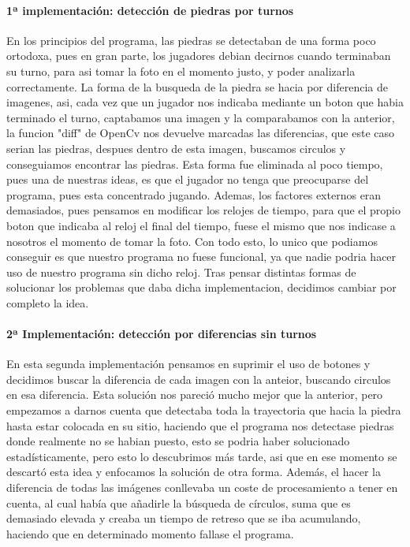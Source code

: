 \documentclass[12pt,a4paper]{report}
\begin{document}
\paragraph{1ª implementación: detección de piedras por turnos}
En los principios del programa, las piedras se detectaban de una forma poco
ortodoxa, pues en gran parte, los jugadores debian decirnos cuando terminaban su
turno, para asi tomar la foto en el momento justo, y poder analizarla
correctamente.  La forma de la busqueda de la piedra se hacia por diferencia de
imagenes, asi, cada vez que un jugador nos indicaba mediante un boton que habia
terminado el turno, captabamos una imagen y la comparabamos con la anterior, la
funcion "diff" de OpenCv nos devuelve marcadas las diferencias, que este caso
serian las piedras, despues dentro de esta imagen, buscamos circulos y
conseguiamos encontrar las piedras.  Esta forma fue eliminada al poco tiempo,
pues una de nuestras ideas, es que el jugador no tenga que preocuparse del
programa, pues esta concentrado jugando. Ademas, los factores externos eran
demasiados, pues pensamos en modificar los relojes de tiempo, para que el propio
boton que indicaba al reloj el final del tiempo, fuese el mismo que nos indicase
a nosotros el momento de tomar la foto. Con todo esto, lo unico que podiamos
conseguir es que nuestro programa no fuese funcional, ya que nadie podria hacer
uso de nuestro programa sin dicho reloj. Tras pensar distintas formas de
solucionar los problemas que daba dicha implementacion, decidimos cambiar por
completo la idea.  %

\paragraph{2ª Implementación: detección por diferencias sin turnos}
En esta segunda implementación pensamos en suprimir el uso de botones y
decidimos buscar la diferencia de cada imagen con la anteior, buscando circulos
en esa diferencia. Esta solución nos pareció mucho mejor que la anterior, pero
empezamos a darnos cuenta que detectaba toda la trayectoria que hacia la piedra
hasta estar colocada en su sitio, haciendo que el programa nos detectase piedras
donde realmente no se habian puesto, esto se podria haber solucionado
estadísticamente, pero esto lo descubrimos más tarde, asi que en ese momento se
descartó esta idea y enfocamos la solución de otra forma. Además, el hacer la
diferencia de todas las imágenes conllevaba un coste de procesamiento a tener en
cuenta, al cual había que añadirle la búsqueda de círculos, suma que es
demasiado elevada y creaba un tiempo de retreso que se iba acumulando, haciendo
que en determinado momento fallase el programa.
\end{document}
